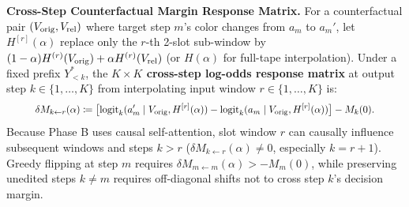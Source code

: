 \textbf{Cross-Step Counterfactual Margin Response Matrix.} For a counterfactual pair $(V_{\mathrm{orig}}, V_{\mathrm{rel}})$ where target step $m$'s color changes from $a_m$ to $a_m'$, let $H^{[r]}(\alpha)$ replace only the $r$-th 2-slot sub-window by $(1-\alpha)H^{(r)}(V_{\mathrm{orig}}) + \alpha H^{(r)}(V_{\mathrm{rel}})$ (or $H(\alpha)$ for full-tape interpolation). Under a fixed prefix $Y^*_{<k}$, the \textbf{$K \times K$ cross-step log-odds response matrix} at output step $k \in \{1, \dots, K\}$ from interpolating input window $r \in \{1, \dots, K\}$ is:
\begin{equation}
  \resizebox{0.89\linewidth}{!}{$\displaystyle \delta M_{k \leftarrow r}(\alpha) \coloneqq \big[\mathrm{logit}_k(a_m' \mid \Vorig, H^{[r]}(\alpha)) - \mathrm{logit}_k(a_m \mid \Vorig, H^{[r]}(\alpha))\big] - M_k(0).$}
  \label{eq:delta_m}
\end{equation}
Because Phase B uses causal self-attention, slot window $r$ can causally influence subsequent windows and steps $k > r$ ($\delta M_{k \leftarrow r}(\alpha) \neq 0$, especially $k = r+1$). Greedy flipping at step $m$ requires $\delta M_{m \leftarrow m}(\alpha) > -M_m(0)$, while preserving unedited steps $k \neq m$ requires off-diagonal shifts not to cross step $k$'s decision margin.

